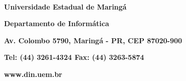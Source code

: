 
~~\\

\vspace{18cm}

\begin{center}

\textbf{Universidade Estadual de Maringá}

\textbf{Departamento de Informática}

\textbf{Av. Colombo 5790, Maringá - PR, CEP 87020-900}

\textbf{Tel: (44) 3261-4324 Fax: (44) 3263-5874}

\textbf{www.din.uem.br}

\end{center}

\pagebreak
